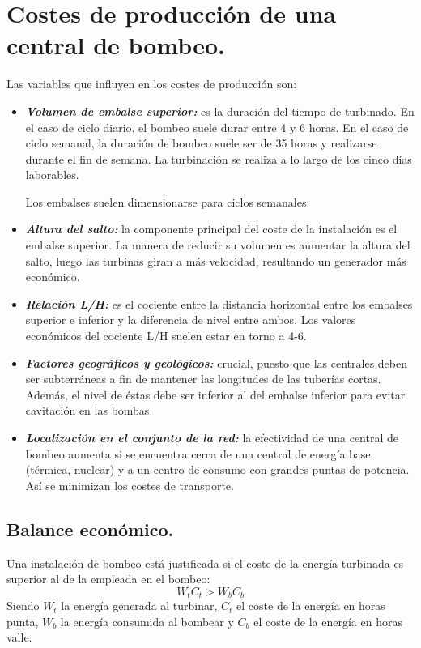 	\section{Costes de producción de una central de bombeo.}
		Las variables que influyen en los costes de producción son:
		\begin{itemize}
			\item \textbf{\textit{Volumen de embalse superior:}} es la duración del tiempo de turbinado. En el caso de ciclo diario, el bombeo suele durar entre 4 y 6 horas. En el caso de ciclo semanal, la duración de bombeo suele ser de 35 horas y realizarse durante el fin de semana. La turbinación se realiza a lo largo de los cinco días laborables.
			
			
			Los embalses suelen dimensionarse para ciclos semanales.
			
			\item \textbf{\textit{Altura del salto:}} la componente principal del coste de la instalación es el embalse superior. La manera de reducir su volumen es aumentar la altura del salto, luego las turbinas giran a más velocidad, resultando un generador más económico.
			
			
			\item \textbf{\textit{Relación L/H:}} es el cociente entre la distancia horizontal entre los embalses superior e inferior y la diferencia de nivel entre ambos. Los valores económicos del cociente L/H suelen estar en torno a 4-6.
			
			
			\item \textbf{\textit{Factores geográficos y geológicos:}} crucial, puesto que las centrales deben ser subterráneas a fin de mantener las longitudes de las tuberías cortas. Además, el nivel de éstas debe ser inferior al del embalse inferior para evitar cavitación en las bombas.
			
			
			\item \textit{\textbf{Localización en el conjunto de la red:}} la efectividad de una central de bombeo aumenta si se encuentra cerca de una central de energía base (térmica, nuclear) y a un centro de consumo con grandes puntas de potencia. Así se minimizan los costes de transporte.
		\end{itemize}
		
		\subsection{Balance económico.}
			Una instalación de bombeo está justificada si el coste de la energía turbinada es superior al de la empleada en el bombeo:
			\[W_t C_t > W_b C_b\]
			Siendo $W_t$ la energía generada al turbinar, $C_t$ el coste de la energía en horas punta, $W_b$ la energía consumida al bombear y $C_b$ el coste de la energía en horas valle.
			
